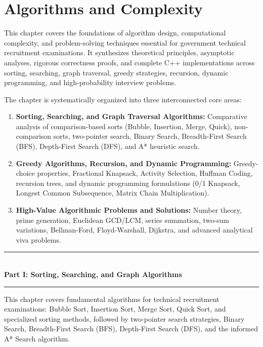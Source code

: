 \chapter{Algorithms and Complexity}
\label{ch:algorithms}

This chapter covers the foundations of algorithm design, computational complexity, and problem-solving techniques essential for government technical recruitment examinations. It synthesizes theoretical principles, asymptotic analyses, rigorous correctness proofs, and complete C++ implementations across sorting, searching, graph traversal, greedy strategies, recursion, dynamic programming, and high-probability interview problems.

The chapter is systematically organized into three interconnected core areas:
\begin{enumerate}[label=\bfseries Part \Roman*:, leftmargin=*, align=left, itemsep=4pt, parsep=2pt]
    \item \textbf{Sorting, Searching, and Graph Traversal Algorithms:} Comparative analysis of comparison-based sorts (Bubble, Insertion, Merge, Quick), non-comparison sorts, two-pointer search, Binary Search, Breadth-First Search (BFS), Depth-First Search (DFS), and A* heuristic search.
    \item \textbf{Greedy Algorithms, Recursion, and Dynamic Programming:} Greedy-choice properties, Fractional Knapsack, Activity Selection, Huffman Coding, recursion trees, and dynamic programming formulations (0/1 Knapsack, Longest Common Subsequence, Matrix Chain Multiplication).
    \item \textbf{High-Value Algorithmic Problems and Solutions:} Number theory, prime generation, Euclidean GCD/LCM, series summation, two-sum variations, Bellman-Ford, Floyd-Warshall, Dijkstra, and advanced analytical viva problems.
\end{enumerate}


\begin{center}
\vspace{1em}
{\color{primary}\rule{0.5\textwidth}{1.5pt}}\\[6pt]
{\Large\bfseries\color{primary} Part I: Sorting, Searching, and Graph Algorithms}\\[3pt]
{\color{primary}\rule{0.5\textwidth}{1.5pt}}
\vspace{1em}
\end{center}

This chapter covers fundamental algorithms for technical recruitment examinations: Bubble Sort, Insertion Sort, Merge Sort, Quick Sort, and specialized sorting methods, followed by two-pointer search strategies, Binary Search, Breadth-First Search (BFS), Depth-First Search (DFS), and the informed A* Search algorithm.

